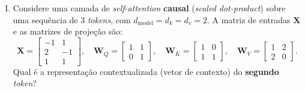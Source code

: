 \documentclass{dlproblemset}
\begin{document}
\begin{enumerate}[I)]
\textbf{II.} A operação de \textit{self-attention} ``crua'' (apenas $\mathrm{softmax}(\mathbf{Q}\mathbf{K}^\top/\sqrt{d})\mathbf{V}$, sem as projeções) não possui parâmetros treináveis.

\textbf{III.} A \textit{self-attention} é permutação-equivariante; por isso é necessário acrescentar \textit{positional encoding} à entrada.

\textbf{IV.} Dividir os \textit{scores} por $d$ (em vez de $\sqrt{d}$) também manteria a variância dos \textit{scores} em $1$.

\textbf{V.} A máscara causal atribui o valor $0$ às posições futuras \emph{antes} do \textit{softmax}.

\begin{enumerate}[a)]
    \item Apenas I, II e III estão corretas.
    \item Apenas I, II, III e IV estão corretas.
    \item Apenas I e III estão corretas.
    \item Apenas II, III e IV estão corretas.
    \item Apenas I, III e V estão corretas.
    \item Apenas III, IV e V estão corretas.
    \item Todas as afirmações estão corretas.
    \item Apenas I e II estão corretas.
\end{enumerate}

\item Considere uma camada de \textit{self-attention} \textbf{causal} (\textit{scaled dot-product}) sobre uma sequência de 3 \textit{tokens}, com $d_\text{model} = d_k = d_v = 2$. A matriz de entradas $\mathbf{X}$ e as matrizes de projeção são:
\[
\mathbf{X} = \begin{bmatrix} -1 & 1 \\ 2 & -1 \\ 1 & 1 \end{bmatrix},
\quad
\mathbf{W}_Q = \begin{bmatrix} 1 & 1 \\ 0 & 1 \end{bmatrix},
\quad
\mathbf{W}_K = \begin{bmatrix} 1 & 0 \\ 1 & 1 \end{bmatrix},
\quad
\mathbf{W}_V = \begin{bmatrix} 1 & 2 \\ 2 & 0 \end{bmatrix}.
\]
Qual é a representação contextualizada (vetor de contexto) do \textbf{segundo} \textit{token}?


\end{enumerate}
\end{document}
